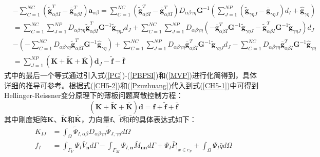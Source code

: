 \begin{equation}
\begin{split}\label{Pzuzhuang}
    &-\sum_{C=1}^{N\!C}(\tilde{\pmb g}_{\alpha\beta I}^T-\bar{\pmb g}_{\alpha\beta I}^T)\pmb a_{\alpha\beta}
    =\sum_{C=1}^{N\!C}(\tilde{\pmb g}_{\alpha\beta I}^T-\bar{\pmb g}_{\alpha\beta I}^T)D_{\alpha\beta\gamma\eta}\pmb{G}^{-1}(\sum_{J=1}^{N\!P}(\tilde{\pmb g}_{\gamma\eta J}-\bar{\pmb g}_{\gamma\eta J})d_I+\hat{\pmb g}_{\gamma\eta})\\
    &=\sum_{C=1}^{N\!C}\sum_{J=1}^{N\!P}D_{\alpha\beta\gamma\eta}\tilde{\pmb g}_{\alpha\beta I}^T\pmb G^{-1}\tilde{\pmb g}_{\gamma\eta J}d_J
    +\sum_{C=1}^{N\!C}\sum_{J=1}^{N\!P}D_{\alpha\beta\gamma\eta}(-\bar{\pmb g}_{\alpha\beta I}^T\pmb G^{-1}\tilde{\pmb g}_{\gamma\eta J}-\tilde{\pmb g}_{\alpha\beta I}^T\pmb G^{-1}\tilde{\pmb g}_{\gamma\eta J})d_J\\
    &-(-\sum_{C=1}^{N\!C}D_{\alpha\beta\gamma\eta}\tilde{\pmb g}_{\alpha\beta I}^T\pmb G^{-1}\hat{\pmb g}_{\gamma\eta })
    +\sum_{C=1}^{N\!C}\sum_{J=1}^{N\!P}D_{\alpha\beta\gamma\eta}\bar{\pmb g}_{\alpha\beta I}^T\pmb G^{-1}\tilde{\pmb g}_{\gamma\eta J}d_J
    -\sum_{C=1}^{N\!C}D_{\alpha\beta\gamma\eta}\bar{\pmb g}_{\alpha\beta I}^T\pmb G^{-1}\hat{\pmb g}_{\gamma\eta }\\
    &=\sum_{J=1}^{N\!P}(\pmb{K}+\tilde{\pmb{K}}+\bar{\pmb{K}})\pmb d_J-\tilde{\pmb f}-\bar{\pmb f}
\end{split}
\end{equation}
式中的最后一个等式通过引入式(\ref{PG})-(\ref{PBPSI})和(\ref{MVP})进行化简得到，具体详细的推导可参考。根据式(\ref{CH5-2})和(\ref{Pzuzhuang})代入到式(\ref{CH5-1})中可得到Hellinger-Reissner变分原理下的薄板问题离散控制方程：
\begin{equation}\label{equationP}
    (\pmb{K}+\tilde{\pmb K}+\bar{\pmb K})\pmb{d}=\pmb{f}+\tilde{\pmb f}+\bar{\pmb f}
\end{equation}
其中刚度矩阵$\pmb K$、$\tilde{\pmb K}$和$\bar{\pmb K}$，力向量$\pmb f$、$\tilde{\pmb f}$和$\bar{\pmb f}$的具体表达式如下：
\begin{subequations}\label{PHR1}
\begin{align}
K_{IJ}&=\int_{\Omega}\tilde{\Psi}_{I,\alpha\beta}D_{\alpha\beta\gamma\eta}\tilde{\Psi}_{J,\gamma\eta}d\Omega \\
f_I&=\int_{\Gamma_V}\Psi_I\bar{V}_{\pmb{n}}d\Gamma-\int_{\Gamma_M}\Psi_{I,\pmb{n}}\bar{M}_{\pmb{nn}}d\Gamma+\Psi_I\bar{P}\vert_{x\in c_P}+\int_{\Omega}\Psi_I\bar{q}d\Omega
\end{align}
\end{subequations}
